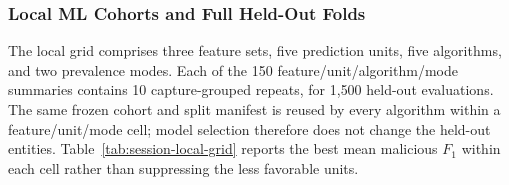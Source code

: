 \documentclass[letterpaper,twocolumn,10pt]{article}
\begin{document}
\begin{table}[t]
\centering
\caption{Local cohorts and pooled complete test-fold appearances.}
\label{tab:session-local-cohorts}
\footnotesize
{}
\end{table}

\subsubsection{Local ML Cohorts and Full Held-Out Folds}

The local grid comprises three feature sets, five prediction units, five algorithms, and two prevalence modes. Each of the 150 feature/unit/algorithm/mode summaries contains 10 capture-grouped repeats, for 1{,}500 held-out evaluations. The same frozen cohort and split manifest is reused by every algorithm within a feature/unit/mode cell; model selection therefore does not change the held-out entities. Table~\ref{tab:session-local-grid} reports the best mean malicious $F_1$ within each cell rather than suppressing the less favorable units.
\end{document}
